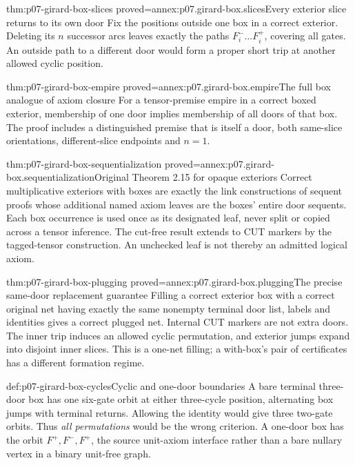 \begin{hblemma}{thm:p07-girard-box-slices}
 {proved=annex:p07.girard-box.slices}{Every exterior slice returns to its own door}
Fix the positions outside one box in a correct exterior.
Deleting its \(n\) successor arcs leaves exactly the paths
\(F_i^-\ldots F_i^+\), covering all gates.
An outside path to a different door would form a proper short trip
at another allowed cyclic position.
\end{hblemma}

\begin{hblemma}{thm:p07-girard-box-empire}
 {proved=annex:p07.girard-box.empire}{The full box analogue of axiom closure}
For a tensor-premise empire in a correct boxed exterior,
membership of one door implies membership of all doors of that box.
The proof includes a distinguished premise that is itself a door,
both same-slice orientations, different-slice endpoints and \(n=1\).
\end{hblemma}

\begin{hbtheorem}{thm:p07-girard-box-sequentialization}
 {proved=annex:p07.girard-box.sequentialization}{Original Theorem 2.15 for opaque exteriors}
Correct multiplicative exteriors with boxes are exactly the link
constructions of sequent proofs whose additional named axiom leaves
are the boxes' entire door sequents. Each box occurrence is used once
as its designated leaf, never split or copied across a tensor inference.
The cut-free result extends to CUT markers by the tagged-tensor
construction. An unchecked leaf is not thereby an admitted logical axiom.
\end{hbtheorem}

\begin{hbtheorem}{thm:p07-girard-box-plugging}
 {proved=annex:p07.girard-box.plugging}{The precise same-door replacement guarantee}
Filling a correct exterior box with a correct original net having
exactly the same nonempty terminal door list, labels and identities
gives a correct plugged net. Internal CUT markers are not extra doors.
The inner trip induces an allowed cyclic permutation, and exterior
jumps expand into disjoint inner slices. This is a one-net filling;
a with-box's pair of certificates has a different formation regime.
\end{hbtheorem}

\begin{hbexample}{def:p07-girard-box-cycles}{Cyclic and one-door boundaries}
A bare terminal three-door box has one six-gate orbit at either
three-cycle position, alternating box jumps with terminal returns.
Allowing the identity would give three two-gate orbits.
Thus \emph{all permutations} would be the wrong criterion.
A one-door box has the orbit \(F^+,F^-,F^+\), the source unit-axiom
interface rather than a bare nullary vertex in a binary unit-free graph.
\end{hbexample}

